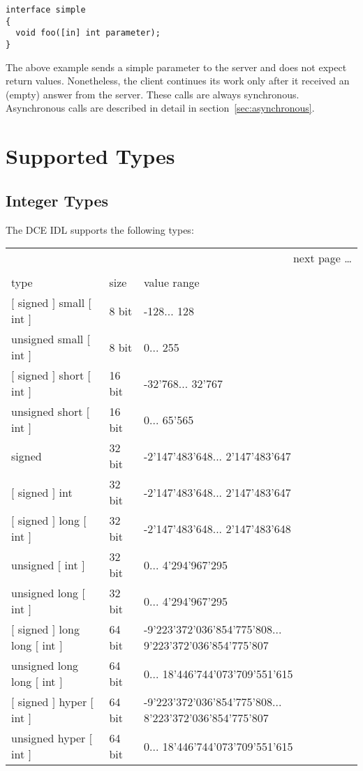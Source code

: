 \begin{verbatim}
interface simple
{
  void foo([in] int parameter);
}
\end{verbatim}

The above example sends a simple parameter to the server and
does not expect return values. Nonetheless, the client continues
its work only after it received an (empty) 
answer from the server. These calls are always synchronous.
Asynchronous calls are described in detail in section~\ref{sec:asynchronous}.

\section{Supported Types}

\subsection{Integer Types}
The DCE IDL supports the following types:

\begin{center}
\begin{longtable}{|l|l|p{6cm}|}%
  \multicolumn{3}{r}{next page \dots}\\\endfoot%
  \multicolumn{3}{l}{\dots continued from last page}\\\endhead%
  \endfirsthead%
  \endlastfoot%
  \hline
type & size & value range \\ \hline
$[$ signed $]$ small $[$ int $]$ & 8 bit & -128... 128 \\
unsigned small $[$ int $]$ & 8 bit & 0... 255 \\ 
$[$ signed $]$ short $[$ int $]$ & 16 bit & -32'768... 32'767 \\
unsigned short $[$ int $]$ & 16 bit & 0... 65'565 \\
signed & 32 bit & -2'147'483'648... 2'147'483'647 \\
$[$ signed $]$ int & 32 bit & -2'147'483'648... 2'147'483'647 \\
$[$ signed $]$ long $[$ int $]$ & 32 bit & -2'147'483'648... 2'147'483'648 \\
unsigned $[$ int $]$ & 32 bit & 0... 4'294'967'295 \\
unsigned long $[$ int $]$ & 32 bit & 0... 4'294'967'295 \\
$[$ signed $]$ long long $[$ int $]$ & 64 bit & -9'223'372'036'854'775'808... 9'223'372'036'854'775'807 \\
unsigned long long $[$ int $]$ & 64 bit & 0... 18'446'744'073'709'551'615 \\
$[$ signed $]$ hyper $[$ int $]$ & 64 bit & -9'223'372'036'854'775'808... 8'223'372'036'854'775'807 \\
unsigned hyper $[$ int $]$ & 64 bit & 0... 18'446'744'073'709'551'615 \\
\hline
\end{longtable}
\end{center}

